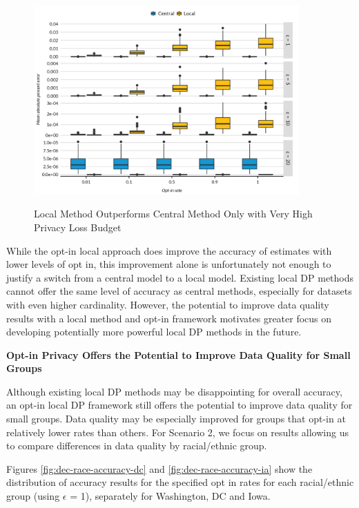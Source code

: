 \documentclass[
]{urban-formatting}
\begin{document}
\begin{figure}[!htb]
    \centering
    \caption{Local Method Outperforms Central Method Only with Very High Privacy Loss Budget}
    \includegraphics[width=4in]{../analysis/figures/dec-methods-accuracy.png}
    \label{fig:dec-methods-accuracy}
\end{figure}

While the opt-in local approach does improve the accuracy of estimates
with lower levels of opt in, this improvement alone is unfortunately not
enough to justify a switch from a central model to a local model.
Existing local DP methods cannot offer the same level of accuracy as
central methods, especially for datasets with even higher cardinality.
However, the potential to improve data quality results with a local
method and opt-in framework motivates greater focus on developing
potentially more powerful local DP methods in the future.

\textbf{Opt-in Privacy Offers the Potential to Improve Data Quality for
Small Groups}

Although existing local DP methods may be disappointing for overall
accuracy, an opt-in local DP framework still offers the potential to
improve data quality for small groups. Data quality may be especially
improved for groups that opt-in at relatively lower rates than others.
For Scenario 2, we focus on results allowing us to compare differences
in data quality by racial/ethnic group.

Figures \ref{fig:dec-race-accuracy-dc} and
\ref{fig:dec-race-accuracy-ia} show the distribution of accuracy results
for the specified opt in rates for each racial/ethnic group (using
\(\epsilon\) = 1), separately for Washington, DC and Iowa.
\end{document}
